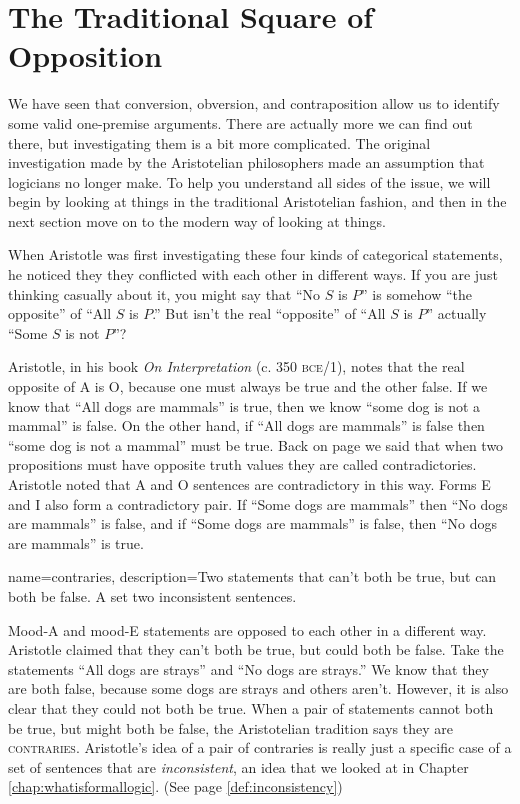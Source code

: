 
\section{The Traditional Square of Opposition}

We have seen that conversion, obversion, and contraposition allow us to identify some valid one-premise arguments. There are actually more we can find out there, but investigating them is a bit more complicated. The original investigation made by the Aristotelian philosophers made an assumption that logicians no longer make.  To help you understand all sides of the issue, we will begin by looking at things in the traditional Aristotelian fashion, and then in the next section move on to the modern way of looking at things. 

When Aristotle was first investigating these four kinds of categorical statements, he noticed they they conflicted with each other in different ways. If you are just thinking casually about it, you might say that ``No $S$ is $P$'' is somehow ``the opposite'' of ``All $S$ is $P$.'' But isn't the real ``opposite'' of ``All $S$ is $P$'' actually ``Some $S$ is not $P$''?  

Aristotle, in his book \textit{On Interpretation} (c. 350 \textsc{bce}/1\citeyear{Aristotle1984a}), notes that the real opposite of A is O, because one must always be true and the other false.  If we know that ``All dogs are mammals'' is true, then we know ``some dog is not a mammal'' is false. On the other hand, if ``All dogs are mammals'' is false then ``some dog is not a mammal'' must be true. Back on page \pageref{def:contradictory} we said that when two propositions must have opposite truth values they are called contradictories. Aristotle noted that A and O sentences are contradictory in this way. Forms E and I also form a contradictory pair. If ``Some dogs are mammals'' then ``No dogs are mammals'' is false, and if ``Some dogs are mammals'' is false, then ``No dogs are mammals'' is true.


{
name=contraries,
description={Two statements that can't both be true, but can both be false. A set two inconsistent sentences.}
}


Mood-A and mood-E statements are opposed to each other in a different way. Aristotle claimed that they can't both be true, but could both be false. Take the statements ``All dogs are strays'' and ``No dogs are strays.'' We know that they are both false, because some dogs are strays and others aren't. However, it is also clear that they could not both be true. When a pair of statements cannot both be true, but might both be false, the Aristotelian tradition says they are \textsc{\gls{contraries}}. \label{def:Contraries} Aristotle's idea of a pair of contraries is really just a specific case of a set of sentences that are \emph{inconsistent}, an idea that we looked at in Chapter \ref{chap:whatisformallogic}. (See page \ref{def:inconsistency})

